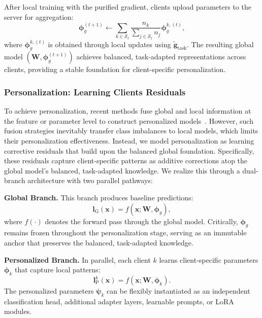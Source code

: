 \documentclass[10pt,twocolumn,letterpaper]{article}
\begin{document}
After local training with the purified gradient, clients upload parameters to the server for aggregation:
\begin{equation}
\boldsymbol{\phi}_g^{(t+1)} \leftarrow \sum_{k \in \mathcal{S}_t} \frac{n_k}{\sum_{j \in \mathcal{S}_t} n_j} \boldsymbol{\phi}_g^{k,(t)},
\end{equation}
where $\boldsymbol{\phi}_g^{k,(t)}$ is obtained through local updates using $\tilde{\mathbf{g}}_{\text{task}}$. The resulting global model $(\boldsymbol{W}, \boldsymbol{\phi}_g^{(t+1)})$ achieves balanced, task-adapted representations across clients, providing a stable foundation for client-specific personalization.


\subsubsection{Personalization: Learning Clients Residuals}
\label{subsec:personalization}

To achieve personalization, recent methods fuse global and local information at the feature or parameter level to construct personalized models~\cite{li2021ditto, li2024fedotp, pan2024promptfolio}. However, such fusion strategies inevitably transfer class imbalances to local models, which limits their personalization effectiveness. Instead, we model personalization as learning corrective residuals that build upon the balanced global foundation. Specifically, these residuals capture client-specific patterns as additive corrections atop the global model's balanced, task-adapted knowledge. We realize this through a dual-branch architecture with two parallel pathways:

\noindent\textbf{Global Branch.} This branch produces baseline predictions:
\begin{equation}
\mathbf{l}_{\text{G}}(\mathbf{x}) = f(\mathbf{x}; \boldsymbol{W}, \boldsymbol{\phi}_g),
\end{equation}
where $f(\cdot)$ denotes the forward pass through the global model. Critically, $\boldsymbol{\phi}_g$ remains frozen throughout the personalization stage, serving as an immutable anchor that preserves the balanced, task-adapted knowledge.

\noindent\textbf{Personalized Branch.} In parallel, each client $k$ learns client-specific parameters $\boldsymbol{\phi}_k$ that capture local patterns:
\begin{equation}
\mathbf{l}_{\text{P}}^k(\mathbf{x}) = f(\mathbf{x}; \boldsymbol{W}, \boldsymbol{\phi}_k).
\end{equation}
The personalized parameters $\boldsymbol{\psi}_k$ can be flexibly instantiated as an independent classification head, additional adapter layers, learnable prompts, or LoRA modules.
\end{document}
